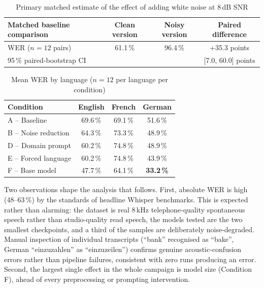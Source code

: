 \documentclass[12pt]{report}
\begin{document}
\begin{table}[H]
\centering
\begin{tabular}{|l|c|c|c|}
\hline
\textbf{Matched baseline comparison} & \textbf{Clean version} & \textbf{Noisy version} & \textbf{Paired difference} \\ \hline
WER ($n=12$ pairs) & 61.1\,\% & 96.4\,\% & +35.3 points \\ \hline
95\,\% paired-bootstrap CI & & & [7.0, 60.0] points \\ \hline
\end{tabular}
\caption{Primary matched estimate of the effect of adding white noise at 8\,dB SNR}
\label{tab:matched_noise}
\end{table}
\begin{table}[H]
\centering
\begin{tabular}{|l|c|c|c|}
\hline
\textbf{Condition} & \textbf{English} & \textbf{French} & \textbf{German} \\ \hline
A -- Baseline & 69.6\,\% & 69.1\,\% & 51.6\,\% \\ \hline
B -- Noise reduction & 64.3\,\% & 73.3\,\% & 48.9\,\% \\ \hline
D -- Domain prompt & 60.2\,\% & 74.8\,\% & 48.9\,\% \\ \hline
E -- Forced language & 60.2\,\% & 74.8\,\% & 43.9\,\% \\ \hline
F -- Base model & 47.7\,\% & 64.1\,\% & \textbf{33.2\,\%} \\ \hline
\end{tabular}
\caption{Mean WER by language ($n=12$ per language per condition)}
\label{tab:results_lang}
\end{table}
Two observations shape the analysis that follows. First, absolute WER is high (48--63\,\%) by the standards of headline Whisper benchmarks. This is expected rather than alarming: the dataset is real 8\,kHz telephone-quality spontaneous speech rather than studio-quality read speech, the models tested are the two smallest checkpoints, and a third of the samples are deliberately noise-degraded. Manual inspection of individual transcripts (\enquote{bank} recognised as \enquote{bake}, German \enquote{einzuzahlen} as \enquote{einzuzeilen}) confirms genuine acoustic-confusion errors rather than pipeline failures, consistent with zero runs producing an error. Second, the largest single effect in the whole campaign is model size (Condition F), ahead of every preprocessing or prompting intervention.
\end{document}

